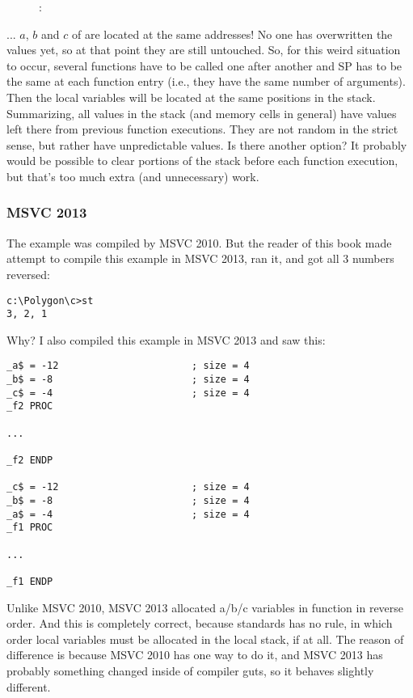 \begin{figure}[H]
\centering
{}
\caption{\olly: }
\label{fig:stack_noise_olly2}
\end{figure}

... $a$, $b$ and $c$ of  are located at the same addresses!
No one has overwritten the values yet, so at that point they are still untouched.
So, for this weird situation to occur, several functions have to be called one after another and
\ac{SP} has to be the same at each function entry (i.e., they have the same number
of arguments). Then the local variables will be located at the same positions in the stack.
Summarizing, all values in the stack (and memory cells in general) have values left there from previous function executions.
They are not random in the strict sense, but rather have unpredictable values.
Is there another option?
It probably would be possible to clear portions of the stack before each function execution,
but that's too much extra (and unnecessary) work.

\subsubsection{MSVC 2013}

The example was compiled by MSVC 2010.
But the reader of this book made attempt to compile this example in MSVC 2013, ran it, and got all 3 numbers reversed:%

\begin{lstlisting}
c:\Polygon\c>st
3, 2, 1
\end{lstlisting}

Why?
I also compiled this example in MSVC 2013 and saw this:


\begin{lstlisting}[caption=MSVC 2013]
_a$ = -12						; size = 4
_b$ = -8						; size = 4
_c$ = -4						; size = 4
_f2	PROC

...

_f2	ENDP

_c$ = -12						; size = 4
_b$ = -8						; size = 4
_a$ = -4						; size = 4
_f1	PROC

...

_f1	ENDP
\end{lstlisting}

Unlike MSVC 2010, MSVC 2013 allocated a/b/c variables in function  in reverse order.%
And this is completely correct, because \CCpp standards has no rule, in which order local variables must be allocated in the local stack, if at all.
The reason of difference is because MSVC 2010 has one way to do it, and MSVC 2013 has probably something changed inside of compiler guts, so it behaves slightly different.

